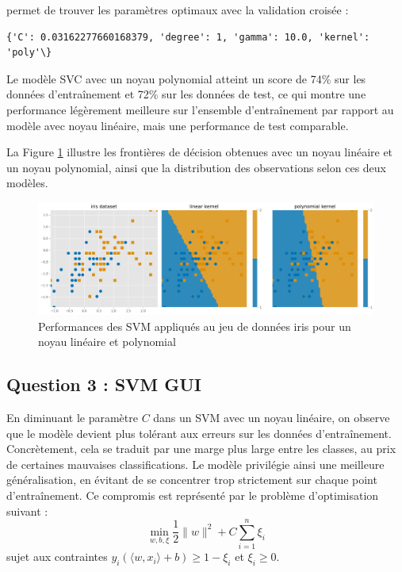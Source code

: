 \documentclass{article}
\begin{document}
permet de trouver les paramètres optimaux avec la validation croisée :

\begin{lstlisting}
{'C': 0.03162277660168379, 'degree': 1, 'gamma': 10.0, 'kernel': 'poly'\}
\end{lstlisting}

\hspace{7pt} Le modèle SVC avec un noyau polynomial atteint un score de 74\% sur les données d'entraînement et 72\% sur les données de test, ce qui montre une performance légèrement meilleure sur l'ensemble d'entraînement par rapport au modèle avec noyau linéaire, mais une performance de test comparable.\newline

\hspace{7pt} La Figure \ref{fig:noyaux} illustre les frontières de décision obtenues avec un noyau linéaire et un noyau polynomial, ainsi que la distribution des observations selon ces deux modèles.
    
\begin{figure}[H]
    \centering
    \includegraphics[width=1\textwidth]{../images/iris.png}
    \caption{\centering Performances des SVM appliqués au jeu de données iris pour un noyau linéaire et polynomial} 
    \label{fig:noyaux}
\end{figure}


\subsection{Question 3 : SVM GUI}

\hspace{7pt} En diminuant le paramètre $C$ dans un SVM avec un noyau linéaire, on observe que le modèle devient plus tolérant aux erreurs sur les données d'entraînement. Concrètement, cela se traduit par une marge plus large entre les classes, au prix de certaines mauvaises classifications. Le modèle privilégie ainsi une meilleure généralisation, en évitant de se concentrer trop strictement sur chaque point d'entraînement.  Ce compromis est représenté par le problème d'optimisation suivant :
\[
\min_{w, b, \xi} \frac{1}{2} \|w\|^2 + C \sum_{i=1}^{n} \xi_i
\]
sujet aux contraintes \(y_i (\langle w, x_i \rangle + b) \geq 1 - \xi_i\) et \(\xi_i \geq 0\).
\newline
\end{document}
